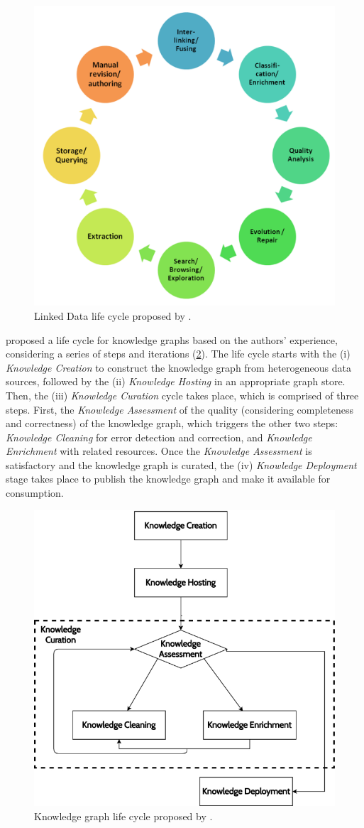 \begin{figure}[]
\centering
\includegraphics[width=0.55\linewidth]{figures/chp2_LD-lifecycle.png}
\caption{Linked Data life cycle proposed by \cite{ngomo2014LD-lifecycle}.}
\label{fig:chp2_LD-lifecycle}
\end{figure}

\cite{simsek2021knowledge} proposed a life cycle for knowledge graphs based on the authors' experience, considering a series of steps and iterations (\cref{fig:chp2_lifecycle-Simsek}). The life cycle starts with the 
(i) \textit{Knowledge Creation} to construct the knowledge graph from heterogeneous data sources, followed by the 
(ii) \textit{Knowledge Hosting} in an appropriate graph store. 
Then, the (iii) \textit{Knowledge Curation} cycle takes place, which is comprised of three steps. First, the \textit{Knowledge Assessment} of the quality (considering completeness and correctness) of the knowledge graph, which triggers the other two steps: \textit{Knowledge Cleaning} for error detection and correction, and \textit{Knowledge Enrichment} with related resources. 
Once the \textit{Knowledge Assessment} is satisfactory and the knowledge graph is curated, the (iv) \textit{Knowledge Deployment} stage takes place to publish the knowledge graph and make it available for consumption.

\begin{figure}[]
\centering
\includegraphics[width=0.5\linewidth]{figures/chp2_lifecycle-Simsek.png}
\caption{Knowledge graph life cycle proposed by \cite{simsek2021knowledge}.}
\label{fig:chp2_lifecycle-Simsek}
\end{figure}

